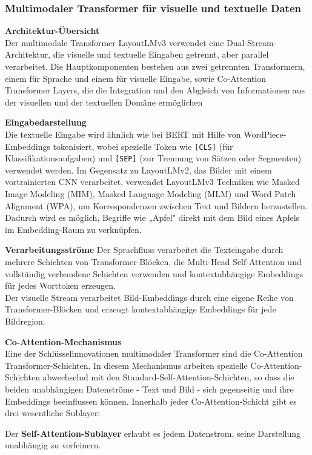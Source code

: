 \documentclass[12pt,a4paper,twoside]{article}
\begin{document}
\subsubsection{Multimodaler Transformer für visuelle und textuelle Daten}

\textbf{Architektur-Übersicht}\\
Der multimodale Transformer LayoutLMv3 verwendet eine Dual-Stream-Architektur, die visuelle und textuelle Eingaben getrennt, aber parallel verarbeitet. Die Hauptkomponenten bestehen aus zwei getrennten Transformern, einem für Sprache und einem für visuelle Eingabe, sowie Co-Attention Transformer Layers, die die Integration und den Abgleich von Informationen aus der visuellen und der textuellen Domäne ermöglichen

\textbf{Eingabedarstellung}\\
Die textuelle Eingabe wird ähnlich wie bei BERT mit Hilfe von WordPiece-Embeddings tokenisiert, wobei spezielle Token wie \texttt{[CLS]} (für Klassifikationsaufgaben) und \texttt{[SEP]} (zur Trennung von Sätzen oder Segmenten) verwendet werden. Im Gegensatz zu LayoutLMv2, das Bilder mit einem vortrainierten CNN verarbeitet, verwendet LayoutLMv3 Techniken wie Masked Image Modeling (MIM), Masked Language Modeling (MLM) und Word Patch Alignment (WPA), um Korrespondenzen zwischen Text und Bildern herzustellen.
Dadurch wird es möglich, Begriffe wie „Apfel" direkt mit dem Bild eines Apfels im Embedding-Raum zu verknüpfen.

\textbf{Verarbeitungsströme}
Der Sprachfluss verarbeitet die Texteingabe durch mehrere Schichten von Transformer-Blöcken, die Multi-Head Self-Attention und vollständig verbundene Schichten verwenden und kontextabhängige Embeddings für jedes Worttoken erzeugen. \\
Der visuelle Stream verarbeitet Bild-Embeddings durch eine eigene Reihe von Transformer-Blöcken und erzeugt kontextabhängige Embeddings für jede Bildregion.

\textbf{Co-Attention-Mechanismus}\\
Eine der Schlüsselinnovationen multimodaler Transformer sind die Co-Attention Transformer-Schichten. In diesem Mechanismus arbeiten spezielle Co-Attention-Schichten abwechselnd mit den Standard-Self-Attention-Schichten, so dass die beiden unabhängigen Datenströme - Text und Bild - sich gegenseitig und ihre Embeddings beeinflussen können.
Innerhalb jeder Co-Attention-Schicht gibt es drei wesentliche Sublayer: 

Der \textbf{Self-Attention-Sublayer} erlaubt es jedem Datenstrom, seine Darstellung unabhängig zu verfeinern.
    
\end{document}
